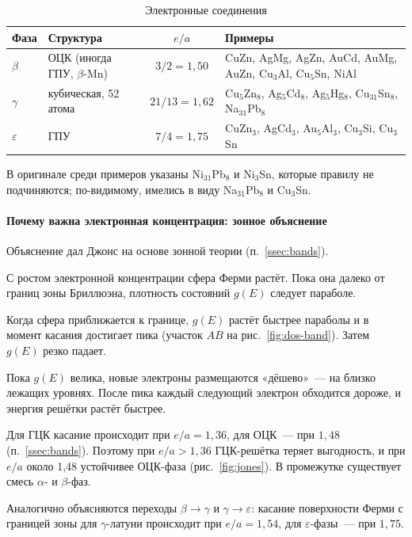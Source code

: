\begin{table}[ht]
\centering
\caption{Электронные соединения}
\label{tab:electron-comp}
\small
\begin{tabularx}{\textwidth}{@{}llc>{\raggedright\arraybackslash}X@{}}
\toprule
Фаза & Структура & $e/a$ & Примеры \\
\midrule
$\beta$ & ОЦК (иногда ГПУ, $\beta$-Mn) & $3/2=1{,}50$ & CuZn, AgMg, AgZn, AuCd, AuMg, AuZn, Cu$_3$Al, Cu$_5$Sn, NiAl \\
$\gamma$ & кубическая, 52 атома & $21/13=1{,}62$ & Cu$_5$Zn$_8$, Ag$_5$Cd$_8$, Ag$_5$Hg$_8$, Cu$_{31}$Sn$_8$, Na$_{31}$Pb$_8$ \\
$\varepsilon$ & ГПУ & $7/4=1{,}75$ & CuZn$_3$, AgCd$_3$, Au$_5$Al$_3$, Cu$_3$Si, Cu$_3$Sn \\
\bottomrule
\end{tabularx}
\end{table}
\noindent В оригинале среди примеров указаны Ni$_{31}$Pb$_8$ и Ni$_3$Sn,
которые правилу не подчиняются; по-видимому, имелись в виду
Na$_{31}$Pb$_8$ и Cu$_3$Sn.

\paragraph{Почему важна электронная концентрация: зонное объяснение}
Объяснение дал Джонс на основе зонной теории (п.~\ref{ssec:bands}).
\begin{shagi}
\item С ростом электронной концентрации сфера Ферми растёт. Пока она
далеко от границ зоны Бриллюэна, плотность состояний $g(E)$ следует
параболе.
\item Когда сфера приближается к границе, $g(E)$ растёт быстрее параболы
и в момент касания достигает пика (участок $AB$ на
рис.~\ref{fig:dos-band}). Затем $g(E)$ резко падает.
\item Пока $g(E)$ велика, новые электроны размещаются «дёшево»~— на
близко лежащих уровнях. После пика каждый следующий электрон
обходится дороже, и энергия решётки растёт быстрее.
\item Для ГЦК касание происходит при $e/a=1{,}36$, для ОЦК~— при
$1{,}48$ (п.~\ref{ssec:bands}). Поэтому при $e/a>1{,}36$ ГЦК-решётка
теряет выгодность, и при $e/a$ около 1,48 устойчивее ОЦК-фаза
(рис.~\ref{fig:jones}). В промежутке существует смесь $\alpha$- и
$\beta$-фаз.
\end{shagi}
Аналогично объясняются переходы $\beta\to\gamma$ и
$\gamma\to\varepsilon$: касание поверхности Ферми с границей зоны для
$\gamma$-латуни происходит при $e/a=1{,}54$, для $\varepsilon$-фазы~— при
$1{,}75$.

